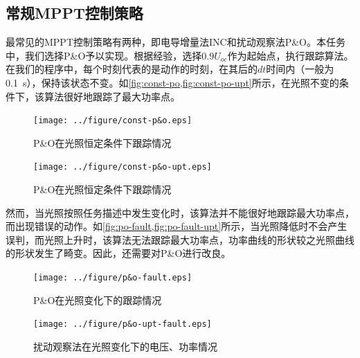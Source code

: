 \documentclass[a4paper,12pt]{article}
\begin{document}
    \subsection{常规MPPT控制策略} %
    \label{sub:常规mppt控制策略}
    最常见的MPPT控制策略有两种，即电导增量法INC和扰动观察法P\&O。本任务中，我们选择P\&O予以实现。根据经验，选择$0.9U_{oc}$作为起始点，执行跟踪算法。在我们的程序中，每个时刻代表的是动作的时刻，在其后的$dt$时间内（一般为\SI{0.1}{\s}），保持该状态不变。如\cref{fig:const-po,fig:const-po-upt}所示，在光照不变的条件下，该算法很好地跟踪了最大功率点。
    \begin{figure}[htbp]
        \centering
        \texttt{[image: ../figure/const-p\&o.eps]}
        \caption{P\&O在光照恒定条件下跟踪情况}
        \label{fig:const-po}
    \end{figure}
    \begin{figure}[htbp]
        \centering
        \texttt{[image: ../figure/const-p\&o-upt.eps]}
        \caption{P\&O在光照恒定条件下跟踪情况}
        \label{fig:const-po-upt}
    \end{figure}

    然而，当光照按照任务描述中发生变化时，该算法并不能很好地跟踪最大功率点，而出现错误的动作。如\cref{fig:po-fault,fig:po-fault-upt}所示，当光照降低时不会产生误判，而光照上升时，该算法无法跟踪最大功率点，功率曲线的形状较之光照曲线的形状发生了畸变。因此，还需要对P\&O进行改良。

    \begin{figure}[htbp]
        \centering
        \texttt{[image: ../figure/p\&o-fault.eps]}
        \caption{P\&O在光照变化下的跟踪情况}
        \label{fig:po-fault}
    \end{figure}
    \begin{figure}[htbp]
        \centering
        \texttt{[image: ../figure/p\&o-upt-fault.eps]}
        \caption{扰动观察法在光照变化下的电压、功率情况}
        \label{fig:po-fault-upt}
    \end{figure}
\end{document}
